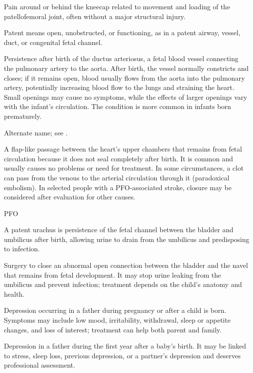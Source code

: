  Pain around or behind the kneecap related to movement and loading of the patellofemoral joint, often without a major structural injury.

 Patent means open, unobstructed, or functioning, as in a patent airway, vessel, duct, or congenital fetal channel.

 Persistence after birth of the ductus arteriosus, a fetal blood vessel connecting the pulmonary artery to the aorta. After birth, the vessel normally constricts and closes; if it remains open, blood usually flows from the aorta into the pulmonary artery, potentially increasing blood flow to the lungs and straining the heart. Small openings may cause no symptoms, while the effects of larger openings vary with the infant’s circulation. The condition is more common in infants born prematurely.

 Alternate name; see
  .

 A flap-like passage between the heart’s upper chambers that remains from fetal circulation
because it does not seal completely after birth. It is common and usually causes no problems or need for treatment. In
some circumstances, a clot can pass from the venous to the arterial circulation through it (paradoxical embolism). In
selected people with a PFO-associated stroke, closure may be considered after evaluation for other causes.

\synonyms
PFO

 A patent urachus is persistence of the fetal channel between the bladder and umbilicus after birth, allowing urine to drain from the umbilicus and predisposing to infection.

 Surgery to close an abnormal open connection between the bladder and the navel that remains from fetal development. It may stop urine leaking from the umbilicus and prevent infection; treatment depends on the child's anatomy and health.

 Depression occurring in a father during pregnancy or after a child is born. Symptoms may include low mood, irritability, withdrawal, sleep or appetite changes, and loss of interest; treatment can help both parent and family.

 Depression in a father during the first year after a baby's birth. It may be linked to stress, sleep loss, previous depression, or a partner's depression and deserves professional assessment.

